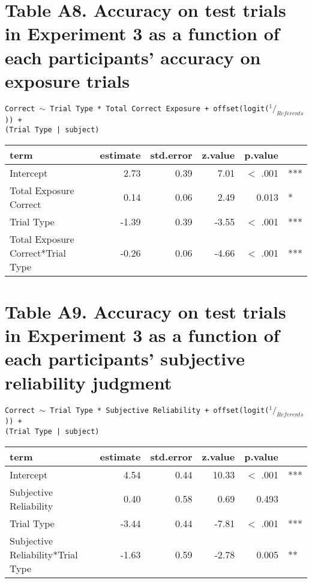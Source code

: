 \documentclass[oneside]{report}
\begin{document}
\section*{Table A8. Accuracy on test trials in Experiment 3 as a function of each participants' accuracy on exposure trials}

\texttt{Correct $\sim$ Trial Type * Total Correct Exposure + offset(logit($^1/_{Referents}$)) + \\ (Trial Type | subject)}
\begin{table}[h]
\centering
\begin{tabular}{lrrrrl}
 term & estimate & std.error & z.value & p.value &  \\ 
  \hline
Intercept & 2.73 & 0.39 & 7.01 & $<$ .001 & *** \\ 
  Total Exposure Correct & 0.14 & 0.06 & 2.49 & 0.013 & * \\ 
  Trial Type & -1.39 & 0.39 & -3.55 & $<$ .001 & *** \\ 
  Total Exposure Correct*Trial Type & -0.26 & 0.06 & -4.66 & $<$ .001 & *** \\ 
   \hline
\end{tabular}
\label{tab:e3_acc_gaze_use}
\end{table}
\newpage

\section*{Table A9. Accuracy on test trials in Experiment 3 as a function of each participants' subjective reliability judgment}

\texttt{Correct $\sim$ Trial Type * Subjective Reliability + offset(logit($^1/_{Referents}$)) + \\ (Trial Type | subject)}
\begin{table}[h]
\centering
\begin{tabular}{lrrrrl}
 term & estimate & std.error & z.value & p.value &  \\ 
  \hline
Intercept & 4.54 & 0.44 & 10.33 & $<$ .001 & *** \\ 
  Subjective Reliability & 0.40 & 0.58 & 0.69 & 0.493 &  \\ 
  Trial Type & -3.44 & 0.44 & -7.81 & $<$ .001 & *** \\ 
  Subjective Reliability*Trial Type & -1.63 & 0.59 & -2.78 & 0.005 & ** \\ 
   \hline
\end{tabular}
\label{tab:e3_acc_subj_rel}
\end{table}
\end{document}
